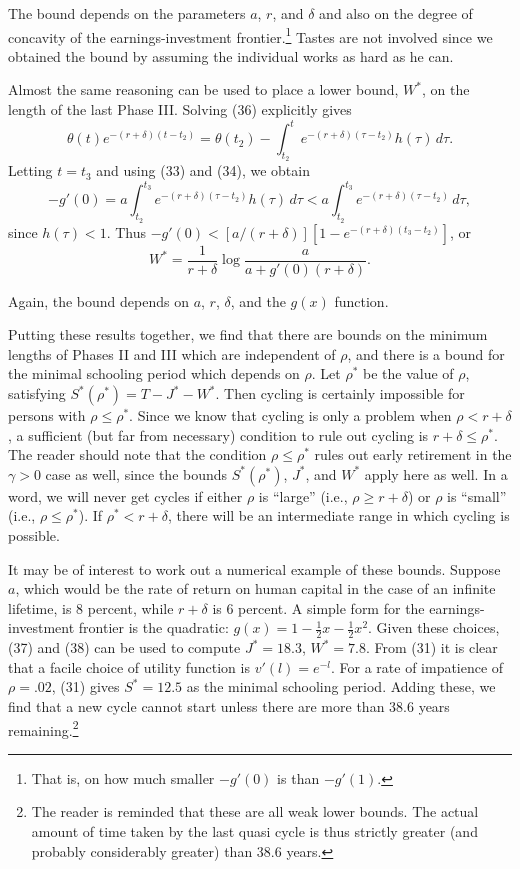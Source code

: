 \documentclass[11pt,fleqn]{article}
\begin{document}
The bound depends on the parameters $a$, $r$, and $\delta$ and also on the degree of concavity of the earnings-investment frontier.\footnote{That is, on how much smaller $-g'(0)$ is than $-g'(1)$.} Tastes are not involved since we obtained the bound by assuming the individual works as hard as he can.

Almost the same reasoning can be used to place a lower bound, $W^*$, on the length of the last Phase III. Solving (36) explicitly gives
\[
\theta(t)e^{-(r+\delta)(t-t_2)} = \theta(t_2) - \int_{t_2}^{t} e^{-(r+\delta)(\tau-t_2)} h(\tau) \, d\tau.
\]
Letting $t = t_3$ and using (33) and (34), we obtain
\[
-g'(0) = a \int_{t_2}^{t_3} e^{-(r+\delta)(\tau-t_2)} h(\tau) \, d\tau < a \int_{t_2}^{t_3} e^{-(r+\delta)(\tau-t_2)} \, d\tau,
\]
since $h(\tau) < 1$. Thus $-g'(0) < [a/(r + \delta)] [1 - e^{-(r+\delta)(t_3-t_2)}]$, or
\begin{equation}
W^* = \frac{1}{r + \delta} \log \frac{a}{a + g'(0)(r + \delta)}.
\end{equation}

Again, the bound depends on $a$, $r$, $\delta$, and the $g(x)$ function.

Putting these results together, we find that there are bounds on the minimum lengths of Phases II and III which are independent of $\rho$, and there is a bound for the minimal schooling period which depends on $\rho$. Let $\rho^*$ be the value of $\rho$, satisfying $S^*(\rho^*) = T - J^* - W^*$. Then cycling is certainly impossible for persons with $\rho \leq \rho^*$. Since we know that cycling is only a problem when $\rho < r + \delta$, a sufficient (but far from necessary) condition to rule out cycling is $r + \delta \leq \rho^*$. The reader should note that the condition $\rho \leq \rho^*$ rules out early retirement in the $\gamma > 0$ case as well, since the bounds $S^*(\rho^*)$, $J^*$, and $W^*$ apply here as well. In a word, we will never get cycles if either $\rho$ is ``large'' (i.e., $\rho \geq r + \delta$) or $\rho$ is ``small'' (i.e., $\rho \leq \rho^*$). If $\rho^* < r + \delta$, there will be an intermediate range in which cycling is possible.

It may be of interest to work out a numerical example of these bounds. Suppose $a$, which would be the rate of return on human capital in the case of an infinite lifetime, is 8 percent, while $r + \delta$ is 6 percent. A simple form for the earnings-investment frontier is the quadratic: $g(x) = 1 - \frac{1}{2}x - \frac{1}{2}x^2$. Given these choices, (37) and (38) can be used to compute $J^* = 18.3$, $W^* = 7.8$. From (31) it is clear that a facile choice of utility function is $v'(l) = e^{-l}$. For a rate of impatience of $\rho = .02$, (31) gives $S^* = 12.5$ as the minimal schooling period. Adding these, we find that a new cycle cannot start unless there are more than 38.6 years remaining.\footnote{The reader is reminded that these are all weak lower bounds. The actual amount of time taken by the last quasi cycle is thus strictly greater (and probably considerably greater) than 38.6 years.}
\end{document}
